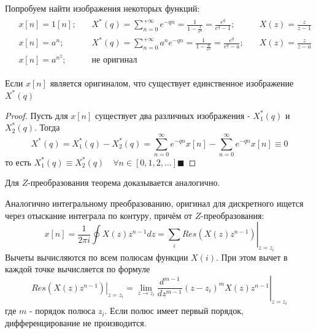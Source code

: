 \documentclass[12pt,twoside]{report}
\theoremstyle{MyNonumberplain}
\begin{document}
            Попробуем найти изображения некоторых функций:
            \begin{eqnarray*}
                \begin{split}
                    &x[n] = 1[n];\quad &X^*(q)=\sum^{+\infty}_{n=0} e^{-qn}=\frac{1}{1-\frac{1}{e^q}}=\frac{e^q}{e^q-1};
                    \quad &X(z)=\frac{z}{z-1}\\
                    &x[n] = a^n;\quad &X^*(q)=\sum^{+\infty}_{n=0} a^ne^{-qn}=\frac{1}{1-\frac{a}{e^q}}=\frac{e^q}{e^q-a};
                    \quad &X(z)=\frac{z}{z-a}\\
                    &x[n] = a^{n^2};\quad &\textit{не оригинал}\quad&
                \end{split}
            \end{eqnarray*}
    
            \begin{theorem}
                Если $x[n]$ является оригиналом, что существует единственное изображение
                $X^*(q)$
            \end{theorem}
            \begin{proof}
                Пусть для $x[n]$ существует два различных изображения - $X^*_1(q)$ и $X^*_2(q)$.
                Тогда 
                \begin{equation}
                    X^*(q)=X^*_1(q)-X^*_2(q) = \sum_{n=0}^{\infty}e^{-qn}x[n]-\sum_{n=0}^{\infty}e^{-qn}x[n] \equiv 0
                \end{equation}
                то есть $X^*_1(q) \equiv X^*_2(q) \quad \forall n \in [0,1,2,\dots] \blacksquare$
            \end{proof}
            Для $Z$-преобразования теорема доказывается аналогично.
    
            Аналогично интегральному преобразованию, оригинал для дискретного ищется через отыскание  интеграла по контуру,
            причём от $Z$-преобразования:
            \begin{equation}
                x[n]=\frac{1}{2\pi i}\oint X(z)z^{n-1}dz=\left.\sum_i Res(X(z)z^{n-1})\right|_{z=z_i}
            \end{equation}
            Вычеты вычисляются по всем полюсам функции $X(i)$. При этом вычет в каждой точке вычисляется по формуле
            \begin{equation}
                \left.Res(X(z)z^{n-1})\right|_{z=z_i}=\left.\lim_{z\to z_i} \frac{d^{m-1}}{dz^{m-1}}(z-z_i)^m X(z)z^{n-1}\right|_{z=z_i}
            \end{equation}
            где $m$ - порядок полюса $z_i$. Если полюс имеет первый порядок, дифференцирование не производится.\\
    
\end{document}
